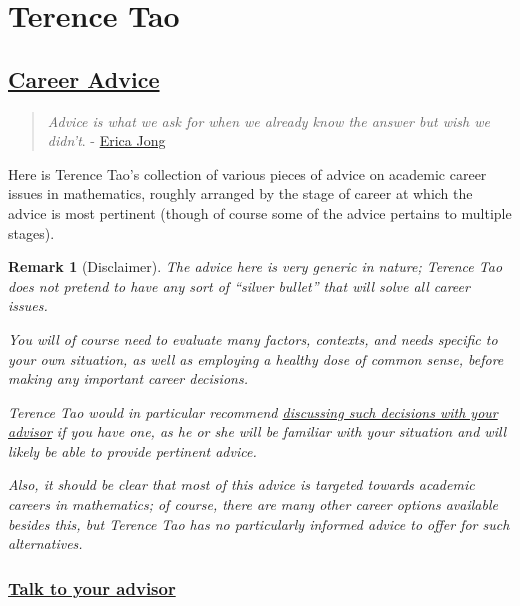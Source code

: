 \documentclass{article}
\newtheorem{remark}{Remark}
\begin{document}

\section{{\sc Terence Tao}}

\subsection{\href{https://terrytao.wordpress.com/career-advice/}{Career Advice}}

\begin{quotation}
	\textit{Advice is what we ask for when we already know the answer but wish we didn't}. - \href{http://en.wikipedia.org/wiki/Erica_Jong}{Erica Jong}
\end{quotation}
Here is Terence Tao's collection of various pieces of advice on academic career issues in mathematics, roughly arranged by the stage of career at which the advice is most pertinent (though of course some of the advice pertains to multiple stages).

\begin{remark}[Disclaimer]
	The advice here is very generic in nature; Terence Tao does not pretend to have any sort of ``silver bullet'' that will solve all career issues.
	
	You will of course need to evaluate many factors, contexts, and needs specific to your own situation, as well as employing a healthy dose of common sense, before making any important career decisions.
	
	Terence Tao would in particular recommend \href{https://terrytao.wordpress.com/career-advice/talk-to-your-advisor/}{discussing such decisions with your advisor} if you have one, as he or she will be familiar with your situation and will likely be able to provide pertinent advice.
	
	Also, it should be clear that most of this advice is targeted towards academic careers in mathematics; of course, there are many other career options available besides this, but Terence Tao has no particularly informed advice to offer for such alternatives.
\end{remark}

\subsubsection{\href{https://terrytao.wordpress.com/career-advice/talk-to-your-advisor/}{Talk to your advisor}}
\end{document}
